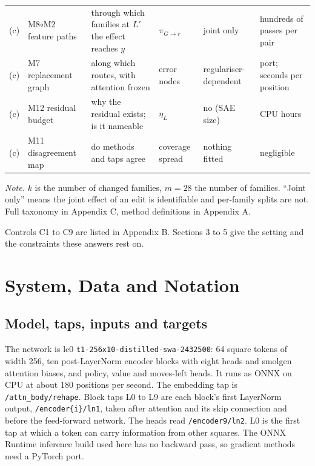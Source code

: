 \documentclass[conference]{IEEEtran}
\begin{document}
\begin{table}[!t]
\begin{tabularx}{\textwidth}{l>{\raggedright\arraybackslash}p{2.2cm}>{\raggedright\arraybackslash}X>{\raggedright\arraybackslash}p{3.2cm}>{\raggedright\arraybackslash}p{1.8cm}>{\raggedright\arraybackslash}p{2.6cm}}
(c) & M8$\circ$M2 feature paths & through which families at $L'$ the effect reaches $y$ & $\pi_{G\to r}$ & joint only & hundreds of passes per pair \\
(c) & M7 replacement graph & along which routes, with attention frozen & error nodes & regulariser-dependent & port; seconds per position \\
(c) & M12 residual budget & why the residual exists; is it nameable & $\eta_L$ & no (SAE size) & CPU hours \\
(c) & M11 disagreement map & do methods and taps agree & coverage spread & nothing fitted & negligible \\
\bottomrule
\end{tabularx}
\par\smallskip
\parbox{\textwidth}{\footnotesize \emph{Note.} $k$ is the number of changed families, $m=28$ the number of families. ``Joint only'' means the joint effect of an edit is identifiable and per-family splits are not. Full taxonomy in Appendix C, method definitions in Appendix A.}
\end{table}

Controls C1 to C9 are listed in Appendix B. Sections 3 to 5 give the setting and the constraints these answers rest on.

\section{System, Data and Notation}\label{sec:3}
\subsection{Model, taps, inputs and targets}\label{sec:3.1}
The network is lc0 \texttt{t1-\allowbreak{}256x10-\allowbreak{}distilled-\allowbreak{}swa-\allowbreak{}2432500}: 64 square tokens of width 256, ten post-LayerNorm encoder blocks with eight heads and smolgen attention biases, and policy, value and moves-left heads. It runs as ONNX on CPU at about 180 positions per second. The embedding tap is \texttt{/\allowbreak{}attn\_\allowbreak{}body/\allowbreak{}rehape}. Block taps L0 to L9 are each block's first LayerNorm output, \texttt{/\allowbreak{}encoder\{i\}/\allowbreak{}ln1}, taken after attention and its skip connection and before the feed-forward network. The heads read \texttt{/\allowbreak{}encoder9/\allowbreak{}ln2}. L0 is the first tap at which a token can carry information from other squares. The ONNX Runtime inference build used here has no backward pass, so gradient methods need a PyTorch port.
\end{document}
